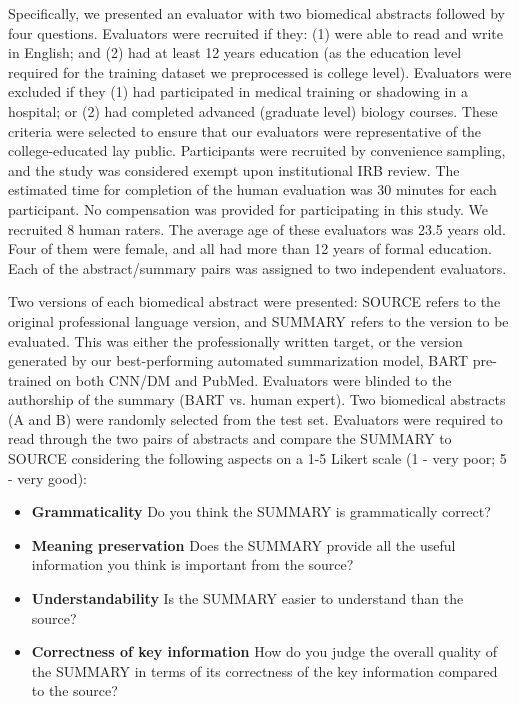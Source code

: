 \documentclass[letterpaper, table]{article} %
\begin{document}
Specifically, we presented an evaluator with two biomedical abstracts followed by four questions. Evaluators were recruited if they: (1) were able to read and write in English; and (2) had at least 12 years education (as the education level required for the training dataset we preprocessed is college level). Evaluators were excluded if they (1) had participated in medical training or shadowing in a hospital; or (2) had completed advanced (graduate level) biology courses. These criteria were selected to ensure that our evaluators were representative of the college-educated lay public. Participants were recruited by convenience sampling, and the study was considered exempt upon institutional IRB review. The estimated time for completion of the human evaluation was 30 minutes for each participant. No compensation was provided for participating in this study.  We recruited 8 human raters.
The average age of these evaluators was 23.5 years old. Four of them were female, and all had more than 12 years of formal education. Each of the abstract/summary pairs was assigned to two independent evaluators.

Two versions of each biomedical abstract were presented: SOURCE refers to the original professional language version, and SUMMARY refers to the version to be evaluated. This was either the professionally written target, or the version generated by our best-performing automated summarization model, BART pre-trained on both CNN/DM and PubMed. Evaluators were blinded to the authorship of the summary (BART vs. human expert). Two biomedical abstracts (A and B) were randomly selected from the test set. Evaluators were required to read through the two pairs of abstracts and compare the SUMMARY to SOURCE considering the following aspects on a 1-5 Likert scale (1 - very poor; 5 - very good):
\begin{itemize}
    \item \textbf{Grammaticality} Do you think the SUMMARY is grammatically correct?
    \item \textbf{Meaning preservation} Does the SUMMARY provide all the useful information you think is important from the source?
    \item \textbf{Understandability} Is the SUMMARY easier to understand than the source?
    \item \textbf{Correctness of key information} How do you judge the overall quality of the SUMMARY in terms of its correctness of the key information compared to the source?
\end{itemize}
\end{document}

